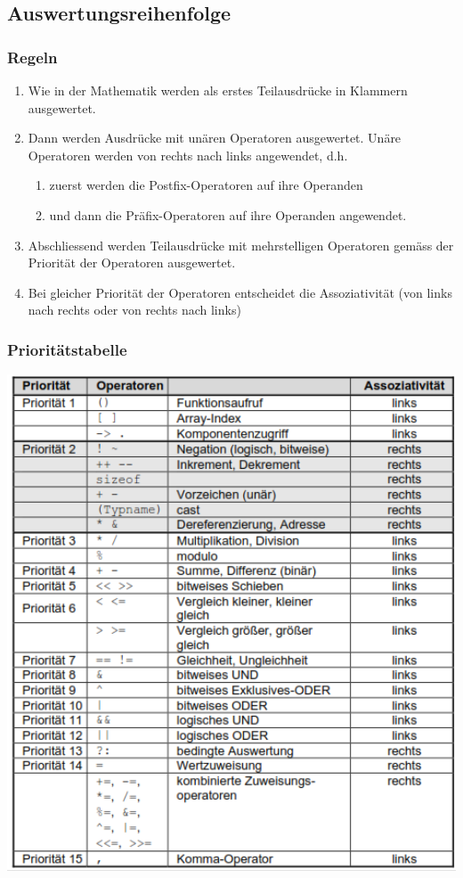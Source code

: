 		\subsection{Auswertungsreihenfolge}
			\subsubsection{Regeln}
				\begin{enumerate}
					\item Wie in der Mathematik werden als erstes Teilausdrücke in Klammern ausgewertet.
					\item Dann werden Ausdrücke mit unären Operatoren ausgewertet. Unäre Operatoren werden von rechts nach links angewendet, d.h.
					\begin{enumerate}
						\item zuerst werden die Postfix-Operatoren auf ihre Operanden
						\item und dann die Präfix-Operatoren auf ihre Operanden angewendet.
					\end{enumerate}
					\item Abschliessend werden Teilausdrücke mit mehrstelligen Operatoren gemäss der Priorität der Operatoren ausgewertet.
					\item Bei gleicher Priorität der Operatoren entscheidet die Assoziativität (von links
					nach rechts oder von rechts nach links)
				\end{enumerate}
			\begin{minipage}[t]{9 cm}
				\subsubsection{Prioritätstabelle}
					\includegraphics[width=1\textwidth]{pics/priotabelle.png}
			\end{minipage}
